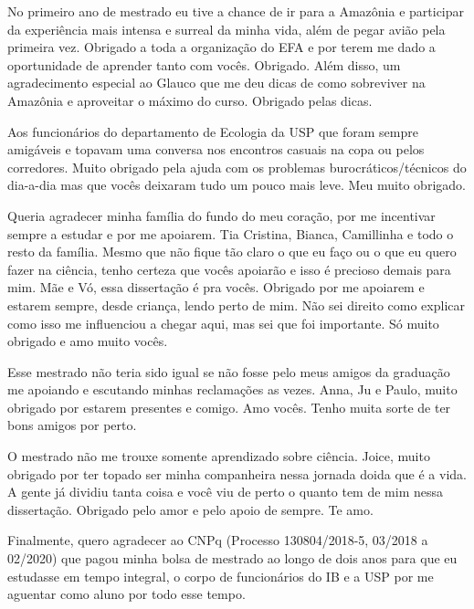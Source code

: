 \documentclass[a4paper, 12pt]{article}
\begin{document}
No primeiro ano de mestrado eu tive a chance de ir para a Amazônia e participar da experiência mais intensa e surreal da minha vida, além de pegar avião pela primeira vez. Obrigado a toda a organização do EFA e por terem me dado a oportunidade de aprender tanto com vocês. Obrigado. Além disso, um agradecimento especial ao Glauco que me deu dicas de como sobreviver na Amazônia e aproveitar o máximo do curso. Obrigado pelas dicas.

Aos funcionários do departamento de Ecologia da USP que foram sempre amigáveis e topavam uma conversa nos encontros casuais na copa ou pelos corredores. Muito obrigado pela ajuda com os problemas burocráticos/técnicos do dia-a-dia mas que vocês deixaram tudo um pouco mais leve. Meu muito obrigado.

Queria agradecer minha família do fundo do meu coração, por me incentivar sempre a estudar e por me apoiarem. Tia Cristina, Bianca, Camillinha e todo o resto da família. Mesmo que não fique tão claro o que eu faço ou o que eu quero fazer na ciência, tenho certeza que vocês apoiarão e isso é precioso demais para mim. Mãe e Vó, essa dissertação é pra vocês. Obrigado por me apoiarem e estarem sempre, desde criança, lendo perto de mim. Não sei direito como explicar como isso me influenciou a chegar aqui, mas sei que foi importante. Só muito obrigado e amo muito vocês.

Esse mestrado não teria sido igual se não fosse pelo meus amigos da graduação me apoiando e escutando minhas reclamações as vezes. Anna, Ju e Paulo, muito obrigado por estarem presentes e comigo. Amo vocês. Tenho muita sorte de ter bons amigos por perto.

O mestrado não me trouxe somente aprendizado sobre ciência. Joice, muito obrigado por ter topado ser minha companheira nessa jornada doida que é a vida. A gente já dividiu tanta coisa e você viu de perto o quanto tem de mim nessa dissertação. Obrigado pelo amor e pelo apoio de sempre. Te amo.

Finalmente, quero agradecer ao CNPq (Processo 130804/2018-5, 03/2018 a 02/2020) que pagou minha bolsa de mestrado ao longo de dois anos para que eu estudasse em tempo integral, o corpo de funcionários do IB e a USP por me aguentar como aluno por todo esse tempo.

\newpage

\tableofcontents
\newpage

\newrefsection
\thispagestyle{plain}
\end{document}
